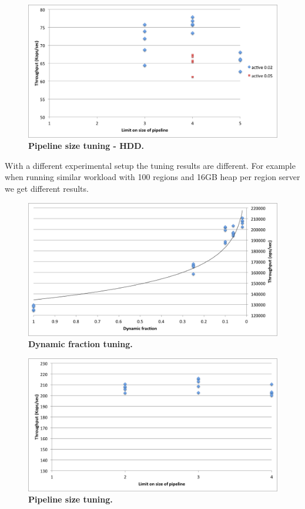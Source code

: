 {\begin{figure}[htb]
\includegraphics[width=\figw]{Figs/pipeline-1-hdd.png}
\caption{{\bf Pipeline size tuning - HDD.} 
}
\label{fig:pipeline-1-hdd}
\end{figure}

With a different experimental setup the tuning results are different.
For example when running similar workload with 100 regions and 16GB heap per region server we get different results.
\begin{figure}[htb]
\includegraphics[width=\figw]{Figs/dynamic-fraction-2.png}
\caption{{\bf Dynamic fraction tuning.} 
}
\label{fig:dynamic-fraction-2}
\end{figure}

\begin{figure}[htb]
\includegraphics[width=\figw]{Figs/pipeline-2.png}
\caption{{\bf Pipeline size tuning.} 
}
\label{fig:pipeline-2}
\end{figure}

}